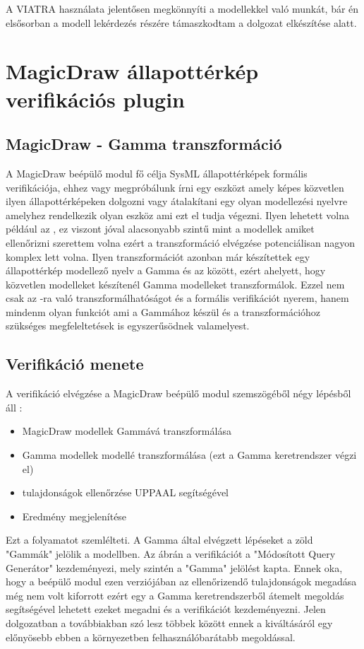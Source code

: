 A VIATRA használata jelentősen megkönnyíti a modellekkel való munkát, bár én elsősorban a modell lekérdezés részére támaszkodtam a dolgozat elkészítése alatt.

\section{MagicDraw állapottérkép verifikációs plugin}

\subsection{MagicDraw - Gamma transzformáció}

A MagicDraw beépülő modul fő célja SysML állapottérképek formális verifikációja, ehhez vagy megpróbálunk írni egy eszközt amely képes közvetlen ilyen állapottérképeken dolgozni vagy átalakítani egy olyan modellezési nyelvre amelyhez rendelkezik olyan eszköz ami ezt el tudja végezni. Ilyen lehetett volna például az \uppaal, ez viszont jóval alacsonyabb szintű mint a modellek amiket ellenőrizni szerettem volna ezért a transzformáció elvégzése potenciálisan nagyon komplex lett volna. Ilyen transzformációt azonban már készítettek egy állapottérkép modellező nyelv a Gamma és az \uppaal  között, ezért ahelyett, hogy közvetlen \uppaal modelleket készítenél Gamma modelleket transzformálok. Ezzel nem csak az \uppaal-ra való transzformálhatóságot és a formális verifikációt nyerem, hanem mindenm olyan funkciót ami a Gammához készül és a transzformációhoz szükséges megfeleltetések is egyszerűsödnek valamelyest.

\subsection{Verifikáció menete}

A verifikáció elvégzése a MagicDraw beépülő modul szemszögéből négy lépésből áll : 
\begin{itemize}
	\item MagicDraw modellek Gammává transzformálása
	\item Gamma modellek \uppaal modellé transzformálása (ezt a Gamma keretrendszer végzi el)
	\item tulajdonságok ellenőrzése UPPAAL segítségével
	\item Eredmény megjelenítése
\end{itemize}
Ezt a folyamatot  szemlélteti. A Gamma által elvégzett lépéseket a zöld "Gammák" jelölik a modellben. Az ábrán a verifikációt a "Módosított Query Generátor" kezdeményezi, mely szintén a "Gamma" jelölést kapta. Ennek oka, hogy a beépülő modul ezen verziójában az ellenőrizendő tulajdonságok megadása még nem volt kiforrott ezért egy a Gamma keretrendszerből átemelt megoldás segítségével lehetett ezeket megadni és a verifikációt kezdeményezni. Jelen dolgozatban a továbbiakban szó lesz többek között ennek a kiváltásáról egy előnyösebb ebben a környezetben felhasználóbarátabb megoldással.

